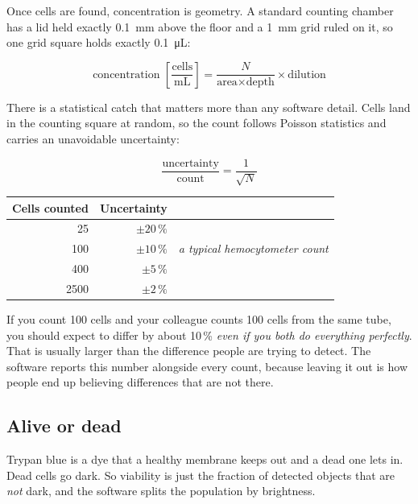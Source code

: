\documentclass[11pt,a4paper]{article}
\begin{document}
Once cells are found, concentration is geometry. A standard counting chamber
has a lid held exactly \SI{0.1}{\milli\meter} above the floor and a
\SI{1}{\milli\meter} grid ruled on it, so one grid square holds exactly
\SI{0.1}{\micro\liter}:

\begin{equation}
\text{concentration }\left[\frac{\text{cells}}{\text{mL}}\right]
=\frac{N}{\text{area}\times\text{depth}}\times\text{dilution}
\end{equation}

There is a statistical catch that matters more than any software detail. Cells
land in the counting square at random, so the count follows Poisson statistics
and carries an unavoidable uncertainty:

\begin{equation}
\frac{\text{uncertainty}}{\text{count}}=\frac{1}{\sqrt{N}}
\end{equation}

\begin{center}\small
\begin{tabular}{rrl}
\toprule
\textbf{Cells counted} & \textbf{Uncertainty} & \\
\midrule
25 & $\pm20\,\%$ & \\
100 & $\pm10\,\%$ & \emph{a typical hemocytometer count} \\
400 & $\pm5\,\%$ & \\
2500 & $\pm2\,\%$ & \\
\bottomrule
\end{tabular}
\end{center}

\begin{plain}
If you count 100 cells and your colleague counts 100 cells from the same tube,
you should expect to differ by about 10\,\% \emph{even if you both do everything
perfectly}. That is usually larger than the difference people are trying to
detect. The software reports this number alongside every count, because leaving
it out is how people end up believing differences that are not there.
\end{plain}

\subsection*{Alive or dead}

Trypan blue is a dye that a healthy membrane keeps out and a dead one lets in.
Dead cells go dark. So viability is just the fraction of detected objects that
are \emph{not} dark, and the software splits the population by brightness.
\end{document}
